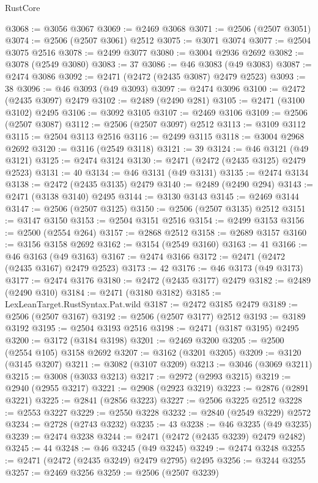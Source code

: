 \begin{lexlean}{RustCore}
\begin{coremodule}
@3068 := @3056 @3067
@3069 := @2469 @3068
@3071 := @2506 (@2507 @3051)
@3074 := @2506 (@2507 @3061) @2512
@3075 := @3071 @3074
@3077 := @2504 @3075 @2516
@3078 := @2499 @3077
@3080 := @3004 @2936 @2692
@3082 := @3078 (@2549 @3080)
@3083 := 37
@3086 := @46 @3083 (@49 @3083)
@3087 := @2474 @3086
@3092 := @2471 (@2472 (@2435 @3087) @2479 @2523)
@3093 := 38
@3096 := @46 @3093 (@49 @3093)
@3097 := @2474 @3096
@3100 := @2472 (@2435 @3097) @2479
@3102 := @2489 (@2490 @281)
@3105 := @2471 (@3100 @3102) @2495
@3106 := @3092 @3105
@3107 := @2469 @3106
@3109 := @2506 (@2507 @3087)
@3112 := @2506 (@2507 @3097) @2512
@3113 := @3109 @3112
@3115 := @2504 @3113 @2516
@3116 := @2499 @3115
@3118 := @3004 @2968 @2692
@3120 := @3116 (@2549 @3118)
@3121 := 39
@3124 := @46 @3121 (@49 @3121)
@3125 := @2474 @3124
@3130 := @2471 (@2472 (@2435 @3125) @2479 @2523)
@3131 := 40
@3134 := @46 @3131 (@49 @3131)
@3135 := @2474 @3134
@3138 := @2472 (@2435 @3135) @2479
@3140 := @2489 (@2490 @294)
@3143 := @2471 (@3138 @3140) @2495
@3144 := @3130 @3143
@3145 := @2469 @3144
@3147 := @2506 (@2507 @3125)
@3150 := @2506 (@2507 @3135) @2512
@3151 := @3147 @3150
@3153 := @2504 @3151 @2516
@3154 := @2499 @3153
@3156 := @2500 (@2554 @264)
@3157 := @2868 @2512
@3158 := @2689 @3157
@3160 := @3156 @3158 @2692
@3162 := @3154 (@2549 @3160)
@3163 := 41
@3166 := @46 @3163 (@49 @3163)
@3167 := @2474 @3166
@3172 := @2471 (@2472 (@2435 @3167) @2479 @2523)
@3173 := 42
@3176 := @46 @3173 (@49 @3173)
@3177 := @2474 @3176
@3180 := @2472 (@2435 @3177) @2479
@3182 := @2489 (@2490 @310)
@3184 := @2471 (@3180 @3182)
@3185 := LexLeanTarget.RustSyntax.Pat.wild
@3187 := @2472 @3185 @2479
@3189 := @2506 (@2507 @3167)
@3192 := @2506 (@2507 @3177) @2512
@3193 := @3189 @3192
@3195 := @2504 @3193 @2516
@3198 := @2471 (@3187 @3195) @2495
@3200 := @3172 (@3184 @3198)
@3201 := @2469 @3200
@3205 := @2500 (@2554 @105) @3158 @2692
@3207 := @3162 (@3201 @3205)
@3209 := @3120 (@3145 @3207)
@3211 := @3082 (@3107 @3209)
@3213 := @3046 (@3069 @3211)
@3215 := @3008 (@3033 @3213)
@3217 := @2972 (@2993 @3215)
@3219 := @2940 (@2955 @3217)
@3221 := @2908 (@2923 @3219)
@3223 := @2876 (@2891 @3221)
@3225 := @2841 (@2856 @3223)
@3227 := @2506 @3225 @2512
@3228 := @2553 @3227
@3229 := @2550 @3228
@3232 := @2840 (@2549 @3229) @2572
@3234 := @2728 (@2743 @3232)
@3235 := 43
@3238 := @46 @3235 (@49 @3235)
@3239 := @2474 @3238
@3244 := @2471 (@2472 (@2435 @3239) @2479 @2482)
@3245 := 44
@3248 := @46 @3245 (@49 @3245)
@3249 := @2474 @3248
@3255 := @2471 (@2472 (@2435 @3249) @2479 @2795) @2495
@3256 := @3244 @3255
@3257 := @2469 @3256
@3259 := @2506 (@2507 @3239)

\end{coremodule}
\end{lexlean}

